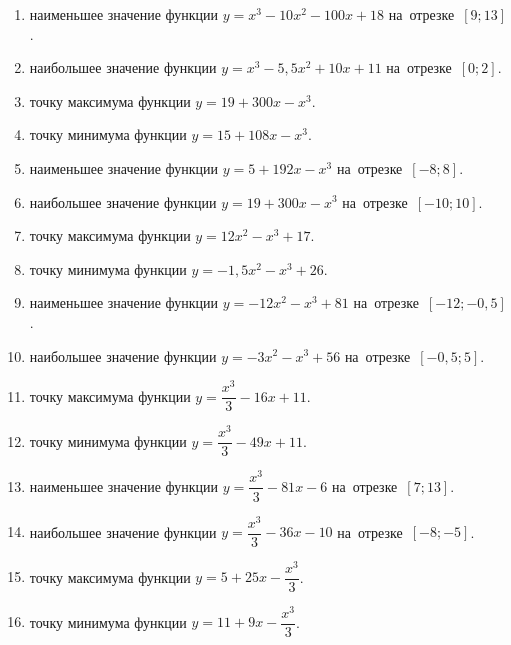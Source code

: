 \documentclass[a4paper,10pt]{article}
\begin{document}
\begin{enumerate}
\item {} наименьшее значение функции $y=x^3 -10x^2-100x+18$ на~отрезке~$\left[9;13\right]$.

\item {} наибольшее значение функции $y=x^3 -5,5x^2+10x+11$ на~отрезке~$\left[0;2\right]$.

\item {} точку максимума функции $y=19+300x-x^3$.

\item {} точку минимума функции $y=15+108x-x^3$.

\item {} наименьшее значение функции $y=5+192x-x^3$ на~отрезке~$\left[-8;8\right]$.

\item {} наибольшее значение функции $y=19+300x-x^3$ на~отрезке~$\left[-10;10\right]$.

\item {} точку максимума функции $y=12x^2-x^3+17$.

\item {} точку минимума функции $y=-1,5x^2-x^3+26$.

\item {} наименьшее значение функции $y=-12x^2-x^3+81$ на~отрезке~$\left[-12;-0,5\right]$.

\item {} наибольшее значение функции $y=-3x^2-x^3+56$ на~отрезке~$\left[-0,5;5\right]$.

\item {} точку максимума функции $y=\dfrac{x^3}{3} -16x+11$.

\item {} точку минимума функции $y=\dfrac{x^3}{3} -49x+11$.

\item {} наименьшее значение функции $y=\dfrac{x^3}{3} -81x-6$ на~отрезке~$\left[7;13\right]$.

\item {} наибольшее значение функции $y=\dfrac{x^3}{3} -36x-10$ на~отрезке~$\left[-8;-5\right]$.

\item {} точку максимума функции $y=5 +25x-\dfrac{x^3}{3}$.

\item {} точку минимума функции $y=11 +9x-\dfrac{x^3}{3}$.


\end{enumerate}
\end{document}
